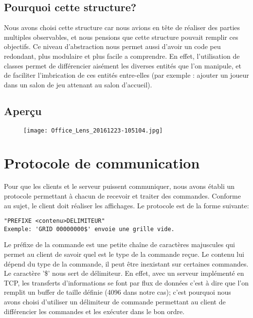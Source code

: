 \documentclass[a4paper]{article}
\begin{document}
\subsection{Pourquoi cette structure?}

Nous avons choisi cette structure car nous avions en tête de réaliser
des parties multiples observables, et nous pensions que cette
structure pouvait remplir ces objectifs. Ce niveau d'abstraction nous
permet aussi d'avoir un code peu redondant, plus modulaire et plus
facile a comprendre. En effet, l'utilisation de classes permet de
différencier aisément les diverses entités que l'on manipule, et de
faciliter l'imbrication de ces entités entre-elles (par exemple :
ajouter un joueur dans un salon de jeu attenant au salon d'accueil).

\newpage
\subsection{Aperçu}

\begin{figure}[h]
\texttt{[image: Office\_Lens\_20161223-105104.jpg]}
\end{figure}



\section{Protocole de communication}

Pour que les clients et le serveur puissent communiquer, nous avons établi un protocole permettant à chacun de recevoir et traiter des commandes. Conforme au sujet, le client doit réaliser les affichages. Le protocole est de la forme suivante:
\begin{verbatim}
"PREFIXE <contenu>DELIMITEUR"
Exemple: 'GRID 00000000$' envoie une grille vide.
\end{verbatim}

Le préfixe de la commande est une petite chaîne de caractères majuscules qui permet au client de savoir quel est le type de la commande reçue. Le contenu lui dépend du type de la commande, il peut être inexistant sur certaines commandes.
Le caractère '\$' nous sert de délimiteur. En effet, avec un serveur implémenté en TCP, les transferts d'informations se font par flux de données c'est à dire que l'on remplit un buffer de taille définie (4096 dans notre cas); c'est pourquoi nous avons choisi d'utiliser un délimiteur de commande permettant au client de différencier les commandes et les exécuter dans le bon ordre.
\end{document}
